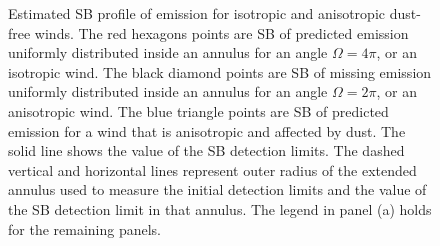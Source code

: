 \documentclass[twocolumn]{aastex61}
\begin{document}
\begin{figure}[h]
\centering
{}
\caption{Estimated SB profile of  emission for isotropic and anisotropic dust-free winds. The red hexagons points are SB of predicted  emission uniformly distributed inside an annulus for an angle $\Omega=4\pi$, or an isotropic wind. The black diamond points are SB of missing  emission uniformly distributed inside an annulus for an angle $\Omega=2\pi$, or an anisotropic wind. The blue triangle points are SB of predicted emission for a wind that is anisotropic and affected by dust. The solid line shows the value of the SB detection limits. The dashed vertical and horizontal lines represent outer radius of the extended annulus used to measure the initial detection limits and the value of the SB detection limit in that annulus. The legend in panel (a) holds for the remaining panels.}
\label{fig.emission}
\end{figure}




\end{document}

